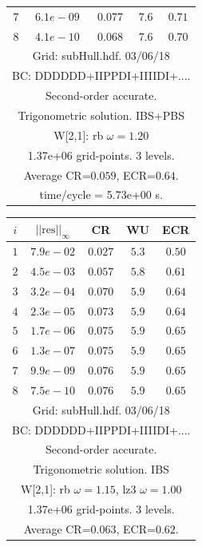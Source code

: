 \begin{table}[hbt]
\begin{center}
{\begin{tabular}{|c|c|c|c|c|}
 $ 7$  & $ 6.1e-09$ & $0.077$ & $ 7.6$ & $0.71$ \\ 
 $ 8$  & $ 4.1e-10$ & $0.068$ & $ 7.6$ & $0.70$ \\ 
\hline 
\multicolumn{5}{|c|}{Grid: subHull.hdf. 03/06/18}  \\
\multicolumn{5}{|c|}{BC: DDDDDD+IIPPDI+IIIIDI+....}  \\
\multicolumn{5}{|c|}{Second-order accurate.}  \\
\multicolumn{5}{|c|}{Trigonometric solution. IBS+PBS }  \\
\multicolumn{5}{|c|}{W[2,1]: rb $\omega=1.20$}  \\
\multicolumn{5}{|c|}{1.37e+06 grid-points. 3 levels.}  \\
\multicolumn{5}{|c|}{Average CR=$0.059$, ECR=$0.64$.}  \\
\multicolumn{5}{|c|}{time/cycle = 5.73e+00 s.}  \\
\hline 
\end{tabular}
\begin{tabular}{|c|c|c|c|c|} \hline 
 $i$   & $\vert\vert\mbox{res}\vert\vert_\infty$  &  CR     &  WU    & ECR  \\   \hline 
 $ 1$  & $ 7.9e-02$ & $0.027$ & $ 5.3$ & $0.50$ \\ 
 $ 2$  & $ 4.5e-03$ & $0.057$ & $ 5.8$ & $0.61$ \\ 
 $ 3$  & $ 3.2e-04$ & $0.070$ & $ 5.9$ & $0.64$ \\ 
 $ 4$  & $ 2.3e-05$ & $0.073$ & $ 5.9$ & $0.64$ \\ 
 $ 5$  & $ 1.7e-06$ & $0.075$ & $ 5.9$ & $0.65$ \\ 
 $ 6$  & $ 1.3e-07$ & $0.075$ & $ 5.9$ & $0.65$ \\ 
 $ 7$  & $ 9.9e-09$ & $0.076$ & $ 5.9$ & $0.65$ \\ 
 $ 8$  & $ 7.5e-10$ & $0.076$ & $ 5.9$ & $0.65$ \\ 
\hline 
\multicolumn{5}{|c|}{Grid: subHull.hdf. 03/06/18}  \\
\multicolumn{5}{|c|}{BC: DDDDDD+IIPPDI+IIIIDI+....}  \\
\multicolumn{5}{|c|}{Second-order accurate.}  \\
\multicolumn{5}{|c|}{Trigonometric solution. IBS}  \\
\multicolumn{5}{|c|}{W[2,1]: rb $\omega=1.15$, lz3 $\omega=1.00$}  \\
\multicolumn{5}{|c|}{1.37e+06 grid-points. 3 levels.}  \\
\multicolumn{5}{|c|}{Average CR=$0.063$, ECR=$0.62$.}  \\

\end{tabular}}
\end{center}
\end{table}
